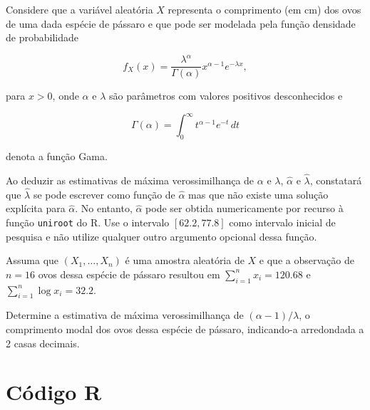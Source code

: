 \documentclass[11pt,a4paper]{article}
\begin{document}
\begin{tcolorbox}[colback=blue!5!white,colframe=blue!75!black,title=Estimação por Máxima Verossimilhança - Exercício 7]

Considere que a variável aleatória \( X \) representa o comprimento (em cm) dos ovos de uma dada espécie de pássaro e que pode ser modelada pela função densidade de probabilidade

\[
f_X(x) = \frac{\lambda^\alpha}{\Gamma(\alpha)} x^{\alpha-1} e^{-\lambda x},
\]

para \( x > 0 \), onde \(\alpha\) e \(\lambda\) são parâmetros com valores positivos desconhecidos e

\[
\Gamma(\alpha) = \int_0^\infty t^{\alpha-1} e^{-t} \, dt
\]

denota a função Gama.

Ao deduzir as estimativas de máxima verossimilhança de \(\alpha\) e \(\lambda\), \(\hat{\alpha}\) e \(\hat{\lambda}\), constatará que \(\hat{\lambda}\) se pode escrever como função de \(\hat{\alpha}\) mas que não existe uma solução explícita para \(\hat{\alpha}\). No entanto, \(\hat{\alpha}\) pode ser obtida numericamente por recurso à função \texttt{uniroot} do R. Use o intervalo \([62.2, 77.8]\) como intervalo inicial de pesquisa e não utilize qualquer outro argumento opcional dessa função.

Assuma que \((X_1, \ldots, X_n)\) é uma amostra aleatória de \(X\) e que a observação de \(n = 16\) ovos dessa espécie de pássaro resultou em \(\sum_{i=1}^n x_i = 120.68\) e \(\sum_{i=1}^n \log x_i = 32.2\).

Determine a estimativa de máxima verossimilhança de \((\alpha - 1)/\lambda\), o comprimento modal dos ovos dessa espécie de pássaro, indicando-a arredondada a 2 casas decimais.

\end{tcolorbox}

\section*{Código R}
\end{document}
